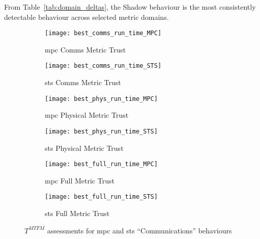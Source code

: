 From Table~\ref{tab:domain_deltas}, the Shadow behaviour is the most consistently detectable behaviour across selected metric domains. 




\begin{figure}
	\begin{subfigure}[b]{0.5\textwidth}
	  \centering
	  \texttt{[image: best\_comms\_run\_time\_MPC]}
	  \caption{\gls{mpc} Comms Metric Trust }
	  \label{fig:comms_time_mpc}
	\end{subfigure}
	\begin{subfigure}[b]{0.5\textwidth}
		\centering
		\texttt{[image: best\_comms\_run\_time\_STS]}
		\caption{\gls{sts} Comms Metric Trust }
		\label{fig:comms_time_sts}
	\end{subfigure}
	
	\begin{subfigure}[b]{0.5\textwidth}
	  \centering
	  \texttt{[image: best\_phys\_run\_time\_MPC]}
	  \caption{\gls{mpc} Physical Metric Trust }
	  \label{fig:phys_time_mpc}
	\end{subfigure}
	\begin{subfigure}[b]{0.5\textwidth}
		\centering
		\texttt{[image: best\_phys\_run\_time\_STS]}
		\caption{\gls{sts} Physical Metric Trust }
		\label{fig:phys_time_sts}
	\end{subfigure}
	
	\begin{subfigure}[b]{0.5\textwidth}
	  \centering
	  \texttt{[image: best\_full\_run\_time\_MPC]}
	  \caption{\gls{mpc} Full Metric Trust }
	  \label{fig:full_time_mpc}
	\end{subfigure}
	\begin{subfigure}[b]{0.5\textwidth}
	  \centering
	  \texttt{[image: best\_full\_run\_time\_STS]}
	  \caption{\gls{sts} Full Metric Trust }
	  \label{fig:full_time_sts}
	\end{subfigure}
	\caption{$T^{MTFM}$ assessments for \gls{mpc} and \gls{sts} ``Communications'' behaviours}
	\label{fig:trust_mpc_sts}
\end{figure}


